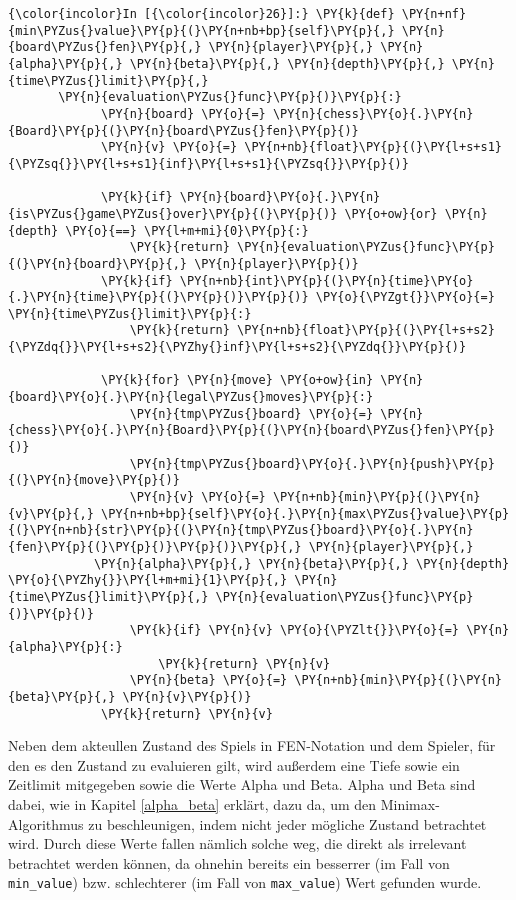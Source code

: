     \begin{Verbatim}[commandchars=\\\{\}]
{\color{incolor}In [{\color{incolor}26}]:} \PY{k}{def} \PY{n+nf}{min\PYZus{}value}\PY{p}{(}\PY{n+nb+bp}{self}\PY{p}{,} \PY{n}{board\PYZus{}fen}\PY{p}{,} \PY{n}{player}\PY{p}{,} \PY{n}{alpha}\PY{p}{,} \PY{n}{beta}\PY{p}{,} \PY{n}{depth}\PY{p}{,} \PY{n}{time\PYZus{}limit}\PY{p}{,} 
	   \PY{n}{evaluation\PYZus{}func}\PY{p}{)}\PY{p}{:}
             \PY{n}{board} \PY{o}{=} \PY{n}{chess}\PY{o}{.}\PY{n}{Board}\PY{p}{(}\PY{n}{board\PYZus{}fen}\PY{p}{)}
             \PY{n}{v} \PY{o}{=} \PY{n+nb}{float}\PY{p}{(}\PY{l+s+s1}{\PYZsq{}}\PY{l+s+s1}{inf}\PY{l+s+s1}{\PYZsq{}}\PY{p}{)}
         
             \PY{k}{if} \PY{n}{board}\PY{o}{.}\PY{n}{is\PYZus{}game\PYZus{}over}\PY{p}{(}\PY{p}{)} \PY{o+ow}{or} \PY{n}{depth} \PY{o}{==} \PY{l+m+mi}{0}\PY{p}{:}
                 \PY{k}{return} \PY{n}{evaluation\PYZus{}func}\PY{p}{(}\PY{n}{board}\PY{p}{,} \PY{n}{player}\PY{p}{)}
             \PY{k}{if} \PY{n+nb}{int}\PY{p}{(}\PY{n}{time}\PY{o}{.}\PY{n}{time}\PY{p}{(}\PY{p}{)}\PY{p}{)} \PY{o}{\PYZgt{}}\PY{o}{=} \PY{n}{time\PYZus{}limit}\PY{p}{:}
                 \PY{k}{return} \PY{n+nb}{float}\PY{p}{(}\PY{l+s+s2}{\PYZdq{}}\PY{l+s+s2}{\PYZhy{}inf}\PY{l+s+s2}{\PYZdq{}}\PY{p}{)}
         
             \PY{k}{for} \PY{n}{move} \PY{o+ow}{in} \PY{n}{board}\PY{o}{.}\PY{n}{legal\PYZus{}moves}\PY{p}{:}
                 \PY{n}{tmp\PYZus{}board} \PY{o}{=} \PY{n}{chess}\PY{o}{.}\PY{n}{Board}\PY{p}{(}\PY{n}{board\PYZus{}fen}\PY{p}{)}
                 \PY{n}{tmp\PYZus{}board}\PY{o}{.}\PY{n}{push}\PY{p}{(}\PY{n}{move}\PY{p}{)}
                 \PY{n}{v} \PY{o}{=} \PY{n+nb}{min}\PY{p}{(}\PY{n}{v}\PY{p}{,} \PY{n+nb+bp}{self}\PY{o}{.}\PY{n}{max\PYZus{}value}\PY{p}{(}\PY{n+nb}{str}\PY{p}{(}\PY{n}{tmp\PYZus{}board}\PY{o}{.}\PY{n}{fen}\PY{p}{(}\PY{p}{)}\PY{p}{)}\PY{p}{,} \PY{n}{player}\PY{p}{,} 
			\PY{n}{alpha}\PY{p}{,} \PY{n}{beta}\PY{p}{,} \PY{n}{depth} \PY{o}{\PYZhy{}}\PY{l+m+mi}{1}\PY{p}{,} \PY{n}{time\PYZus{}limit}\PY{p}{,} \PY{n}{evaluation\PYZus{}func}\PY{p}{)}\PY{p}{)}
                 \PY{k}{if} \PY{n}{v} \PY{o}{\PYZlt{}}\PY{o}{=} \PY{n}{alpha}\PY{p}{:}
                     \PY{k}{return} \PY{n}{v}
                 \PY{n}{beta} \PY{o}{=} \PY{n+nb}{min}\PY{p}{(}\PY{n}{beta}\PY{p}{,} \PY{n}{v}\PY{p}{)}
             \PY{k}{return} \PY{n}{v}
\end{Verbatim}

    Neben dem akteullen Zustand des Spiels in FEN-Notation und dem Spieler,
für den es den Zustand zu evaluieren gilt, wird außerdem eine Tiefe
sowie ein Zeitlimit mitgegeben sowie die Werte Alpha und Beta. Alpha und
Beta sind dabei, wie in Kapitel \ref{alpha_beta} erklärt, dazu da, um den
Minimax-Algorithmus zu beschleunigen, indem nicht jeder mögliche Zustand
betrachtet wird. Durch diese Werte fallen nämlich solche weg, die direkt
als irrelevant betrachtet werden können, da ohnehin bereits ein
besserrer (im Fall von \texttt{min\_value}) bzw. schlechterer (im Fall
von \texttt{max\_value}) Wert gefunden wurde.

